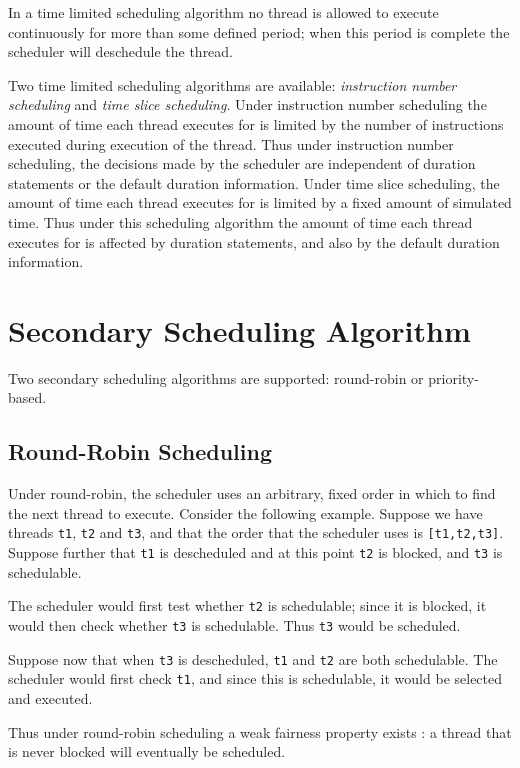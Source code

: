 \documentclass{overturerepchap}
\begin{document}
In a time limited scheduling algorithm no thread is allowed to execute
continuously for more than some defined period; when this period is
complete the scheduler will deschedule the thread.

Two time limited scheduling algorithms are available:
\emph{instruction number scheduling} and \emph{time slice
scheduling}. Under instruction number scheduling the amount of time
each thread executes for is limited by the number of instructions
executed during execution of the thread. Thus under instruction number
scheduling, the decisions made by the scheduler are independent of
duration statements or the default duration information.  Under time
slice scheduling, the amount of time each thread executes for is
limited by a fixed amount of simulated time. Thus under this
scheduling algorithm the amount of time each thread executes for is
affected by duration statements, and also by the default duration
information.

\section{Secondary Scheduling Algorithm}

Two secondary scheduling algorithms are supported: round-robin or
priority-based.

\subsection{Round-Robin Scheduling}

Under round-robin, the scheduler uses an arbitrary, fixed order in
which to find the next thread to execute. Consider the following
example. Suppose we have threads \texttt{t1}, \texttt{t2} and
\texttt{t3}, and that the order that the scheduler uses is
\texttt{[t1,t2,t3]}. Suppose further that \texttt{t1} is descheduled
and at this point \texttt{t2} is blocked, and \texttt{t3} is
schedulable.

The scheduler would first test whether \texttt{t2} is schedulable;
since it is blocked, it would then check whether \texttt{t3} is
schedulable. Thus \texttt{t3} would be scheduled.  

Suppose now that when \texttt{t3} is descheduled, \texttt{t1} and
\texttt{t2} are both schedulable. The scheduler would first check
\texttt{t1}, and since this is schedulable, it would be selected and
executed.

Thus under round-robin scheduling a weak fairness property exists
\cite{Lamport91}: a thread that is never blocked will eventually be
scheduled.
\end{document}
